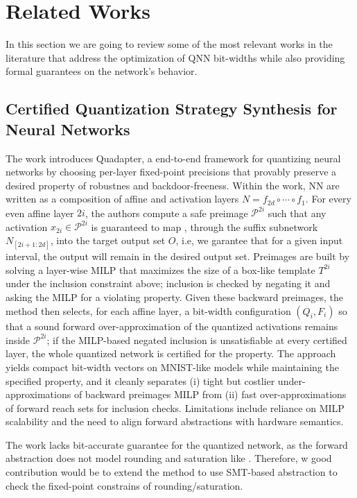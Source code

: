 \chapter{Related Works} \label{chap:related_works}

In this section we are going to review some of the most relevant works in the literature that address the optimization of QNN bit-widths while also providing formal guarantees on the network's behavior.

\section {Certified Quantization Strategy Synthesis for Neural Networks}
The work introduces Quadapter, a end-to-end framework for quantizing neural networks by choosing per-layer fixed-point precisions that provably preserve a desired property of robustnes and backdoor-freeness. Within the work, NN are written as a composition of affine and activation layers \(N=f_{2d}\circ\cdots\circ f_1\). For every even affine layer \(2i\), the authors compute a safe preimage \(\mathcal P^{2i}\) such that any activation \(x_{2i}\in\mathcal P^{2i}\) is guaranteed to map \cite{henzinger2020preimage}, through the suffix subnetwork \(N_{[2i+1:2d]}\), into the target output set \(O\), i.e, we garantee that for a given input interval, the output will remain in the desired output set. Preimages are built by solving a layer-wise MILP that maximizes the size of a box-like template \(T^{2i}\) under the inclusion constraint above; inclusion is checked by negating it and asking the MILP for a violating property. Given these backward preimages, the method then selects, for each affine layer, a bit-width configuration \((Q_i,F_i)\) so that a sound forward over-approximation of the quantized activations  remains inside \(\mathcal P^{2i}\); if the MILP-based negated inclusion is unsatisfiable at every certified layer, the whole quantized network is certified for the property. The approach yields compact bit-width vectors on MNIST-like models while maintaining the specified property, and it cleanly separates (i) tight but costlier under-approximations of backward preimages MILP from (ii) fast over-approximations of forward reach sets for inclusion checks. Limitations include reliance on MILP scalability and the need to align forward abstractions with hardware semantics.

The work lacks bit-accurate guarantee for the quantized network, as the forward abstraction does not model rounding and saturation like \cite{baranowski2020smt}. Therefore, w good contribution would be to extend the method to use SMT-based abstraction to check the fixed-point constrains of rounding/saturation.

